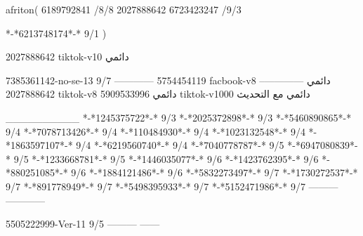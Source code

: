 afriton(
6189792841 /8/8
2027888642
6723423247 /9/3

*-*6213748174*-* 9/1
)

2027888642 tiktok-v10
دائمي


7385361142-no-se-13
9/7
------------
5754454119 facbook-v8
دائمي
--------------
2027888642 tiktok-v8
دائمي
5909533996 tiktok-v1000
دائمي مع التحديث

__________
*-*1245375722*-* 9/3
*-*2025372898*-* 9/3
*-*5460890865*-* 9/4
*-*7078713426*-* 9/4
*-*110484930*-* 9/4
*-*1023132548*-* 9/4
*-*1863597107*-* 9/4
*-*6219560740*-* 9/4
*-*7040778787*-* 9/5
*-*6947080839*-* 9/5
*-*1233668781*-* 9/5
*-*1446035077*-* 9/6
*-*1423762395*-* 9/6
*-*880251085*-* 9/6
*-*1884121486*-* 9/6
*-*5832273497*-* 9/7
*-*1730272537*-* 9/7
*-*891778949*-* 9/7
*-*5498395933*-* 9/7
*-*5152471986*-* 9/7
---------
------------

5505222999-Ver-11
9/5
---------
------

